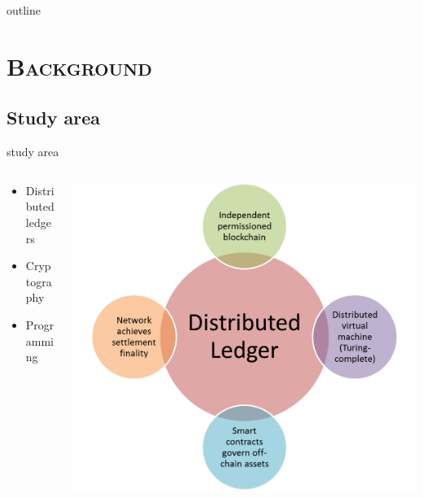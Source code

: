 \documentclass[xcolor=x11names,compress]{beamer}
\renewcommand{\(}{\begin{columns}}
\renewcommand{\)}{\end{columns}}
\newcommand{\<}[1]{\begin{column}{#1}}
\renewcommand{\>}{\end{column}}
\begin{document}
\begin{frame}{outline}
    \tableofcontents
\end{frame}

\section{\scshape Background}
\subsection{Study area}
\begin{frame}{study area}
    \(
        \begin{column}{0.5\textwidth}
    \begin{itemize}
        \item Distributed ledgers
        \item Cryptography
        \item Programming
    \end{itemize}
    \end{column}
        \begin{column}{0.5\textwidth}
            \includegraphics[scale=0.35]{./images/dlt}
        \end{column}
    \)
\end{frame}
\end{document}
